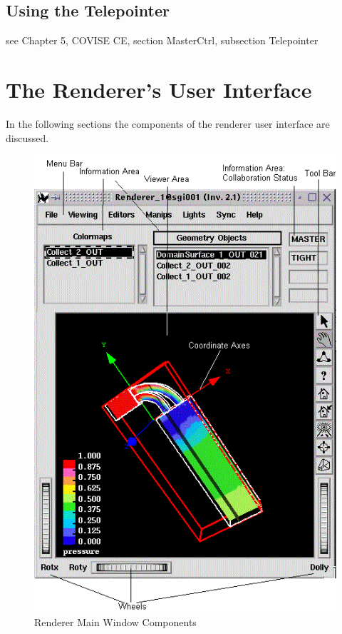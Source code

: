 \subsection{Using the Telepointer}

see Chapter 5, COVISE CE, section MasterCtrl, subsection Telepointer


\section{The Renderer's User Interface}

In the following sections the components of the renderer user interface are discussed.

 \latexonly
 \begin{figure}[htp]
  \begin{center}
   \includegraphics[scale=0.7]{renderer/pict/general}
   \caption{Renderer Main Window Components}
	\label{fig50}
  \end{center}
 \end{figure}
 \endlatexonly

